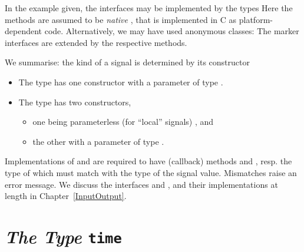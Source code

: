 In the example given, the interfaces may be implemented by the types 
%
% 
Here the methods are assumed to be \emph{native}
, that is implemented in C as 
platform-dependent code. Alternatively, we may have used anonymous classes:
%
% 
The marker interfaces are extended by the respective methods.

We summarise: the kind of a signal is determined by its constructor
\begin{itemize}
  \item The type  has one constructor with a
  parameter of type . 
  
  \item The type  has two constructors,
     \begin{itemize}
        \item one being parameterless (for ``local'' signals)
        , and
        
        \item the other with a parameter of type .
     \end{itemize} 
\end{itemize}
Implementations of  and  are required to have 
(callback) methods  and , resp. 
 the type of which must match with the type of the 
signal value. Mismatches raise an error message. We discuss 
the interfaces  and , and their implementations 
at length in Chapter~\ref{InputOutput}.


\section{\textit{The Type} \texttt{time}}\label{timestamp}

